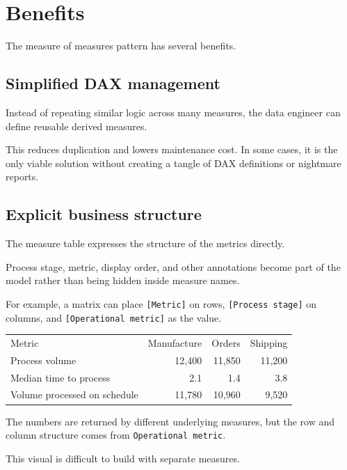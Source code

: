 \documentclass[10pt,openany,10pt]{book}
\newcounter{none}
\let\podeToprule\toprule
\let\podeMidrule\midrule
\let\podeBottomrule\bottomrule
\renewcommand{\toprule}{\arrayrulecolor{pbiGrid}\podeToprule}
\renewcommand{\midrule}{\arrayrulecolor{pbiGrid}\podeMidrule}
\renewcommand{\bottomrule}{\arrayrulecolor{pbiGrid}\podeBottomrule}
\begin{document}
\section{Benefits}\label{benefits}

The measure of measures pattern has several benefits.

\subsection{Simplified DAX management}\label{simplified-dax-management}

Instead of repeating similar logic across many measures, the data
engineer can define reusable derived measures.

This reduces duplication and lowers maintenance cost. In some cases, it
is the only viable solution without creating a tangle of DAX definitions
or nightmare reports.

\subsection{Explicit business
structure}\label{explicit-business-structure}

The measure table expresses the structure of the metrics directly.

Process stage, metric, display order, and other annotations become part
of the model rather than being hidden inside measure names.

For example, a matrix can place \texttt{{[}Metric{]}} on rows,
\texttt{{[}Process\ stage{]}} on columns, and
\texttt{{[}Operational\ metric{]}} as the value.

{\def\LTcaptype{none} %
\begin{longtable}[]{@{}lrrr@{}}
\toprule\noalign{}
Metric & Manufacture & Orders & Shipping \\
\midrule\noalign{}
\endhead
\bottomrule\noalign{}
\endlastfoot
Process volume & 12,400 & 11,850 & 11,200 \\
Median time to process & 2.1 & 1.4 & 3.8 \\
Volume processed on schedule & 11,780 & 10,960 & 9,520 \\
\end{longtable}
}

The numbers are returned by different underlying measures, but the row
and column structure comes from
\texttt{\textquotesingle{}Operational\ metric\textquotesingle{}}.

This visual is difficult to build with separate measures.
\end{document}
